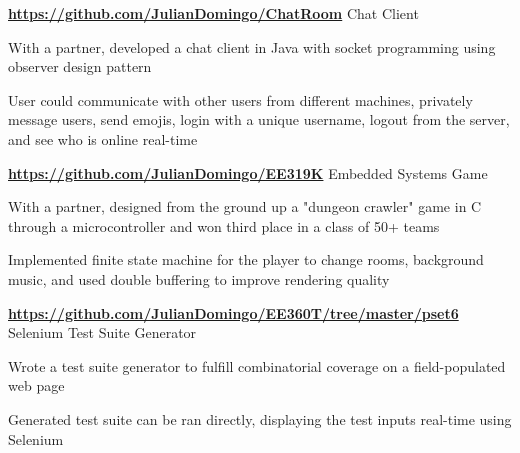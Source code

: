 \begin{cventries}
  \cventry
    {\normalsize \textbf{\url{https://github.com/JulianDomingo/ChatRoom}}}
    {\large Chat Client}
    {}
    {}
    {
      \begin{cvitems}
        \item {\normalsize With a partner, developed a chat client in Java with socket programming using observer design pattern}
        \item {\normalsize User could communicate with other users from different machines, privately message users, send emojis, login with a unique username, logout from the server, and see who is online real-time}
      \end{cvitems}
    }
  \cventry
    {\normalsize \textbf{\url{https://github.com/JulianDomingo/EE319K}}}
    {\large Embedded Systems Game}
    {}
    {}
    {
      \begin{cvitems}
        \item {\normalsize With a partner, designed from the ground up a "dungeon crawler" game in C through a microcontroller and won third place in a class of 50+ teams}
        \item {\normalsize Implemented finite state machine for the player to change rooms, background music, and used double buffering to improve rendering quality}
      \end{cvitems}
    }
  \cventry
    {\normalsize \textbf{\url{https://github.com/JulianDomingo/EE360T/tree/master/pset6}}}
    {\large Selenium Test Suite Generator}
    {}
    {}
    {
      \begin{cvitems}
        \item {\normalsize Wrote a test suite generator to fulfill combinatorial coverage on a field-populated web page}
        \item {\normalsize Generated test suite can be ran directly, displaying the test inputs real-time using Selenium}
      \end{cvitems}
    }
\end{cventries}
